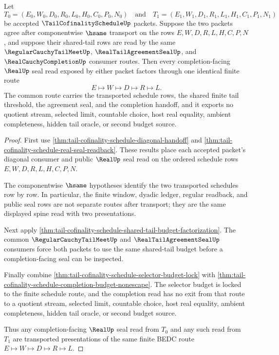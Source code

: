 \begin{theorem}
\label{thm:tail-cofinality-schedule-transport-determinacy}
Let
$$
T_0=(E_0,W_0,D_0,R_0,L_0,H_0,C_0,P_0,N_0)
\quad\text{and}\quad
T_1=(E_1,W_1,D_1,R_1,L_1,H_1,C_1,P_1,N_1)
$$
be accepted $\TailCofinalityScheduleUp$ packets. Suppose the two packets agree
after componentwise $\hsame$ transport on the rows $E,W,D,R,L,H,C,P,N$, and
suppose their shared-tail rows are read by the same
$\RegularCauchyTailMeetUp$, $\RealTailAgreementSealUp$, and
$\RealCauchyCompletionUp$ consumer routes. Then every completion-facing
$\RealUp$ seal read exposed by either packet factors through one identical
finite route
$$
E \longmapsto W \longmapsto D \longmapsto R \longmapsto L.
$$
The common route carries the transported schedule rows, the shared finite tail
threshold, the agreement seal, and the completion handoff, and it exports no
quotient stream, selected limit, countable choice, host real equality, ambient
completeness, hidden tail oracle, or second budget source.
\end{theorem}
\begin{proof}
First use \autoref{thm:tail-cofinality-schedule-diagonal-handoff} and
\autoref{thm:tail-cofinality-schedule-real-seal-readback}. These results place
each accepted packet's diagonal consumer and public $\RealUp$ seal read on the
ordered schedule rows $E,W,D,R,L,H,C,P,N$.

The componentwise $\hsame$ hypotheses identify the two transported schedules
row by row. In particular, the finite window, dyadic ledger, regular readback,
and public seal rows are not separate routes after transport; they are the same
displayed spine read with two presentations.

Next apply
\autoref{thm:tail-cofinality-schedule-shared-tail-budget-factorization}. The
common $\RegularCauchyTailMeetUp$ and $\RealTailAgreementSealUp$ consumers force
both packets to use the same shared-tail budget before a completion-facing seal
can be inspected.

Finally combine \autoref{thm:tail-cofinality-schedule-selector-budget-lock}
with \autoref{thm:tail-cofinality-schedule-completion-budget-nonescape}. The
selector budget is locked to the finite schedule route, and the completion read
has no exit from that route to a quotient stream, selected limit, countable
choice, host real equality, ambient completeness, hidden tail oracle, or second
budget source.

Thus any completion-facing $\RealUp$ seal read from $T_0$ and any such read from
$T_1$ are transported presentations of the same finite BEDC route
$E \longmapsto W \longmapsto D \longmapsto R \longmapsto L$.
\end{proof}

